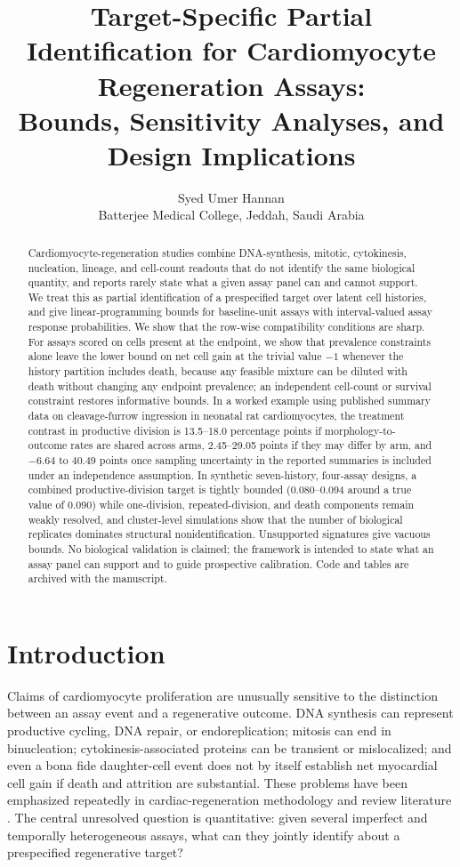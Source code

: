 \documentclass[11pt]{article}
\title{Target-Specific Partial Identification for Cardiomyocyte Regeneration Assays:\\Bounds, Sensitivity Analyses, and Design Implications}
\author{Syed Umer Hannan\\Batterjee Medical College, Jeddah, Saudi Arabia}
\date{}
\begin{document}
\maketitle

\begin{abstract}
Cardiomyocyte-regeneration studies combine DNA-synthesis, mitotic, cytokinesis, nucleation, lineage, and cell-count readouts that do not identify the same biological quantity, and reports rarely state what a given assay panel can and cannot support. We treat this as partial identification of a prespecified target over latent cell histories, and give linear-programming bounds for baseline-unit assays with interval-valued assay response probabilities. We show that the row-wise compatibility conditions are sharp. For assays scored on cells present at the endpoint, we show that prevalence constraints alone leave the lower bound on net cell gain at the trivial value $-1$ whenever the history partition includes death, because any feasible mixture can be diluted with death without changing any endpoint prevalence; an independent cell-count or survival constraint restores informative bounds. In a worked example using published summary data on cleavage-furrow ingression in neonatal rat cardiomyocytes, the treatment contrast in productive division is 13.5--18.0 percentage points if morphology-to-outcome rates are shared across arms, 2.45--29.05 points if they may differ by arm, and $-6.64$ to $40.49$ points once sampling uncertainty in the reported summaries is included under an independence assumption. In synthetic seven-history, four-assay designs, a combined productive-division target is tightly bounded (0.080--0.094 around a true value of 0.090) while one-division, repeated-division, and death components remain weakly resolved, and cluster-level simulations show that the number of biological replicates dominates structural nonidentification. Unsupported signatures give vacuous bounds. No biological validation is claimed; the framework is intended to state what an assay panel can support and to guide prospective calibration. Code and tables are archived with the manuscript.
\end{abstract}

\section{Introduction}
Claims of cardiomyocyte proliferation are unusually sensitive to the distinction between an assay event and a regenerative outcome. DNA synthesis can represent productive cycling, DNA repair, or endoreplication; mitosis can end in binucleation; cytokinesis-associated proteins can be transient or mislocalized; and even a bona fide daughter-cell event does not by itself establish net myocardial cell gain if death and attrition are substantial. These problems have been emphasized repeatedly in cardiac-regeneration methodology and review literature \citep{Leone2015,Auchampach2022,Gan2020,Kirillova2021}. The central unresolved question is quantitative: given several imperfect and temporally heterogeneous assays, what can they jointly identify about a prespecified regenerative target?
\end{document}

